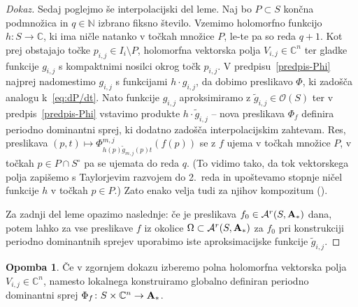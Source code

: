 \documentclass[12pt,a4paper,twoside]{article}
\theoremstyle{definition} %
\newtheorem{opomba}[definicija]{Opomba}
\newenvironment{dokaz}[1][Dokaz]{\begin{proof}[#1]}{\end{proof}}
\theoremstyle{plain} %
\numberwithin{equation}{section}  %
\begin{document}
\begin{dokaz}
Sedaj poglejmo še interpolacijski del leme. Naj bo $P \subset S$ končna podmnožica in $q \in \mathbb{N}$ izbrano fiksno število. Vzemimo holomorfno funkcijo $h \colon S \to \mathbb{C}$, ki ima ničle natanko v točkah množice $P$, le-te pa so reda $q+1$. Kot prej obstajajo točke $p_{i,j} \in I_{i} \setminus P$, holomorfna vektorska polja $V_{i,j} \in \mathbb{C}^{n}$ ter gladke funkcije $g_{i,j}$ s kompaktnimi nosilci okrog točk $p_{i,j}$. V predpisu~\eqref{predpis-Phi} najprej nadomestimo $g_{i,j}$ s funkcijami $h \cdot g_{i,j}$, da dobimo preslikavo $\Phi$, ki zadošča analogu k~\eqref{eq:dP/dt}. Nato funkcije $g_{i,j}$ aproksimiramo z $\tilde{g}_{i,j} \in \mathcal{O}(S)$ ter v predpis~\eqref{predpis-Phi} vstavimo produkte $h \cdot \tilde{g}_{i,j}$ -- nova preslikava $\Phi_{f}$ definira periodno dominantni sprej, ki dodatno zadošča interpolacijskim zahtevam.
Res, preslikava $(p,t) \mapsto \Phi_{h(p) \tilde{g}_{m,j}(p) t}^{m,j} (f(p))$ se z $f$ ujema v točkah množice $P$, v točkah $p \in P \cap S^{\circ}$ pa se ujemata do reda $q$. (To vidimo tako, da tok vektorskega polja zapišemo s Taylorjevim razvojem do 2.~reda in upoštevamo stopnje ničel funkcije $h$ v točkah $p \in P$.) Zato enako velja tudi za njihov kompozitum (\cite[Lemma~2.2]{alarcon2018interpolation}).

Za zadnji del leme opazimo naslednje: če je preslikava $f_{0} \in \mathcal{A}^{r}(S, \textbf{\textup{A}}_{*})$ dana, potem lahko za vse preslikave $f$ iz okolice $\Omega \subset \mathcal{A}^{r}(S, \textbf{\textup{A}}_{*})$ za $f_{0}$ pri konstrukciji periodno dominantnih sprejev uporabimo iste aproksimacijske funkcije $\tilde{g}_{i,j}$.
\end{dokaz}

\begin{opomba} \label{op:PDS-globalno}
Če v zgornjem dokazu izberemo polna holomorfna vektorska polja $V_{i,j} \in \mathbb{C}^{n}$, namesto lokalnega konstruiramo globalno definiran periodno dominantni sprej $\Phi_{f} \colon S \times \mathbb{C}^{n} \to \textbf{\textup{A}}_{*}$.
\end{opomba}

\end{document}

